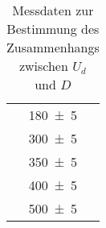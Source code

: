 \begin{table}[!h]
	\centering
	\begin{tabular}{|c|}
		\hline
		\num{180(5)}\\
		\num{300(5)}\\
		\num{350(5)}\\
		\num{400(5)}\\
		\num{500(5)}\\
		\hline
	\end{tabular}
	\caption{Messdaten zur Bestimmung des Zusammenhangs zwischen $U_d$ und $D$ \label{tab:Auswertung_Messdaten_I}}
\end{table}
